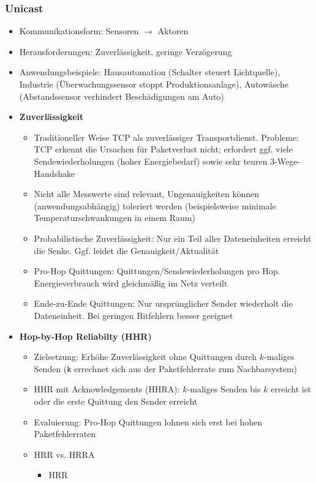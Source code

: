 \subsubsection{Unicast}
\begin{itemize}
	\item Kommunikationsform: Sensoren \(\rightarrow\) Aktoren
	\item Herausforderungen: Zuverlässigkeit, geringe Verzögerung
	\item Anwendungsbeispiele: Hausautomation (Schalter steuert Lichtquelle), Industrie (Überwachungssensor stoppt Produktionsanlage), Autowäsche (Abstandssensor verhindert Beschädigungen am Auto)
	\item \textbf{Zuverlässigkeit}
	\begin{itemize}
		\item Traditioneller Weise TCP als zuverlässiger Transportdienst. Probleme: TCP erkennt die Ursachen für Paketverlust nicht; erfordert ggf. viele Sendewiederholungen (hoher Energiebedarf) sowie sehr teuren 3-Wege-Handshake
		\item Nicht alle Messwerte sind relevant, Ungenauigkeiten können (anwendungsabhängig) toleriert werden (beispielsweise minimale Temperaturschwankungen in einem Raum)
		\item Probabilistische Zuverlässigkeit: Nur ein Teil aller Dateneinheiten erreicht die Senke. Ggf. leidet die Genauigkeit/Aktualität
		\item Pro-Hop Quittungen: Quittungen/Sendewiederholungen pro Hop. Energieverbrauch wird gleichmäßig im Netz verteilt
		\item Ende-zu-Ende Quittungen: Nur ursprünglicher Sender wiederholt die Dateneinheit. Bei geringen Bitfehlern besser geeignet
	\end{itemize}
	\item \textbf{Hop-by-Hop Reliabilty (HHR)}
	\begin{itemize}
		\item Zielsetzung: Erhöhe Zuverlässigkeit ohne Quittungen durch \(k\)-maliges Senden (\texttt{k} errechnet sich aus der Paketfehlerrate zum Nachbarsystem)
		\item HHR mit Acknowledgements (HHRA): \(k\)-maliges Senden bis \(k\) erreicht ist oder die erste Quittung den Sender erreicht
		\item Evaluierung: Pro-Hop Quittungen lohnen sich erst bei hohen Paketfehlerraten
		\item HRR vs. HRRA
		\begin{itemize}
			\item HRR

\end{itemize}
\end{itemize}
\end{itemize}
